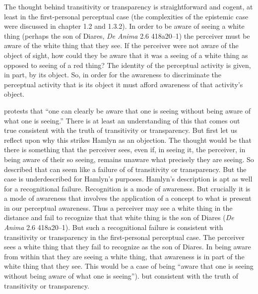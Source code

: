 
The thought behind transitivity or transparency is straightforward and cogent, at least in the first-personal perceptual case (the complexities of the epistemic case were discussed in chapter 1.2 and 1.3.2). In order to be aware of seeing a white thing (perhaps the son of Diares, \emph{De Anima} 2.6 418a20–1) the perceiver must be aware of the white thing that they see. If the perceiver were not aware of the object of sight, how could they be aware that it was a seeing of a white thing as opposed to seeing of a red thing? The identity of the perceptual activity is given, in part, by its object. So, in order for the awareness to discriminate the perceptual activity that is its object it must afford awareness of that activity's object.

\citet[122]{Hamlyn:1961ys} protests that ``one can clearly be aware that one is seeing without being aware of what one is seeing.'' There is at least an understanding of this that comes out true consistent with the truth of transitivity or transparency. But first let us reflect upon why this strikes Hamlyn as an objection. The thought would be that there is something that the perceiver sees, even if, in seeing it, the perceiver, in being aware of their so seeing, remains unaware what precisely they are seeing. So described that can seem like a failure of of transitivity or transparency. But the case is underdescribed for Hamlyn's purposes. Hamlyn's description is apt as well for a recognitional failure. Recognition is a mode of awareness. But crucially it is a mode of awareness that involves the application of a concept to what is present in our perceptual awareness. Thus a perceiver may see a white thing in the distance and fail to recognize that that white thing is the son of Diares (\emph{De Anima} 2.6 418a20–1). But such a recognitional failure is consistent with transitivity or transparency in the first-personal perceptual case. The perceiver sees a white thing that they fail to recognize as the son of Diares. In being aware from within that they are seeing a white thing, that awareness is in part of the white thing that they see. This would be a case of being ``aware that one is seeing without being aware of what one is seeing''). but consistent with the truth of transitivity or transparency.

